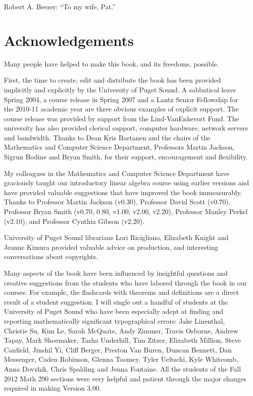 \documentclass{ximera}
\begin{document}
Robert A. Beezer: ``To my wife, Pat.''

\section{Acknowledgements}

Many people have helped to make this book, and its freedoms, possible.

First, the time to create, edit and distribute the book has been
provided implicitly and explicitly by the University of Puget Sound. A
sabbatical leave Spring 2004, a course release in Spring 2007 and a
Lantz Senior Fellowship for the 2010-11 academic year are three
obvious examples of explicit support. The course release was provided
by support from the Lind-VanEnkevort Fund. The university has also
provided clerical support, computer hardware, network servers and
bandwidth. Thanks to Dean Kris Bartanen and the chairs of the
Mathematics and Computer Science Department, Professors Martin
Jackson, Sigrun Bodine and Bryan Smith, for their support,
encouragement and flexibility.

My colleagues in the Mathematics and Computer Science Department have
graciously taught our introductory linear algebra course using earlier
versions and have provided valuable suggestions that have improved the
book immeasurably. Thanks to Professor Martin Jackson (v0.30),
Professor David Scott (v0.70), Professor Bryan Smith (v0.70, 0.80,
v1.00, v2.00, v2.20), Professor Manley Perkel (v2.10), and Professor
Cynthia Gibson (v2.20).

University of Puget Sound librarians Lori Ricigliano, Elizabeth Knight
and Jeanne Kimura provided valuable advice on production, and
interesting conversations about copyrights.

Many aspects of the book have been influenced by insightful questions
and creative suggestions from the students who have labored through
the book in our courses. For example, the flashcards with theorems and
definitions are a direct result of a student suggestion. I will single
out a handful of students at the University of Puget Sound who have
been especially adept at finding and reporting mathematically
significant typographical errors: Jake Linenthal, Christie Su, Kim Le,
Sarah McQuate, Andy Zimmer, Travis Osborne, Andrew Tapay, Mark
Shoemaker, Tasha Underhill, Tim Zitzer, Elizabeth Million, Steve
Canfield, Jinshil Yi, Cliff Berger, Preston Van Buren, Duncan Bennett,
Dan Messenger, Caden Robinson, Glenna Toomey, Tyler Ueltschi, Kyle
Whitcomb, Anna Dovzhik, Chris Spalding and Jenna Fontaine. All the
students of the Fall 2012 Math 290 sections were very helpful and
patient through the major changes required in making Version 3.00.
\end{document}
